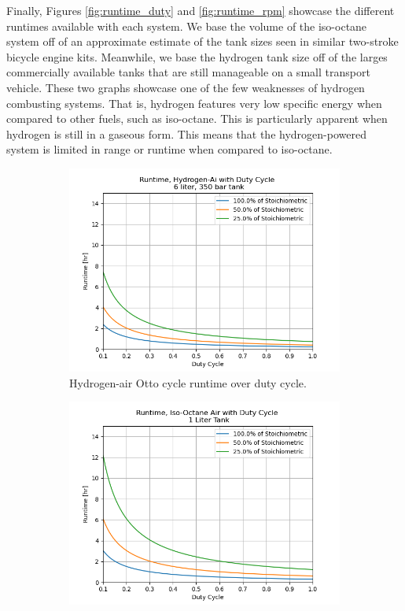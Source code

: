\documentclass[conf]{new-aiaa}
\begin{document}
Finally, Figures \ref{fig:runtime_duty} and \ref{fig:runtime_rpm} showcase the different runtimes available with each system. We base the volume of the iso-octane system off of an approximate estimate of the tank sizes seen in similar two-stroke bicycle engine kits. Meanwhile, we base the hydrogen tank size off of the larges commercially available tanks that are still manageable on a small transport vehicle. These two graphs showcase one of the few weaknesses of hydrogen combusting systems. That is, hydrogen features very low specific energy when compared to other fuels, such as iso-octane. This is particularly apparent when hydrogen is still in a gaseous form. This means that the hydrogen-powered system is limited in range or runtime when compared to iso-octane.

\begin{figure}[H]
\centering
\begin{subfigure}{0.5\linewidth}
  \centering
  \includegraphics[width=1\linewidth]{Figures/Hydrogen/runtime_duty_cycle.png}
  \caption{Hydrogen-air Otto cycle runtime over duty cycle.}
  \label{fig:runtime_duty_h2}
\end{subfigure}%
\begin{subfigure}{0.5\linewidth}
  \centering
  \includegraphics[width=1\linewidth]{Figures/Iso-octane/runtime_duty_cycle.png}

\end{subfigure}
\end{figure}
\end{document}
